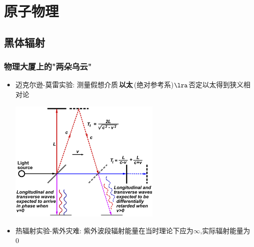 \documentclass{article}
\begin{document}
\vspace{2em}

\newpage

\section{原子物理}
\subsection{黑体辐射}

\subsubsection{物理大厦上的"两朵乌云"}
\begin{itemize}
    \item 迈克尔逊-莫雷实验: 测量假想介质\,\textbf{以太}\,(绝对参考系)$\lra$否定以太得到狭义相对论

          \vspace{1em}

          \includegraphics[width=20em,keepaspectratio]{./pictures/4.png}

          \vspace{1em}

    \item 热辐射实验-紫外灾难: 紫外波段辐射能量在当时理论下应为$\infty$,实际辐射能量为$0$
\end{itemize}

\vspace{2em}
\end{document}
